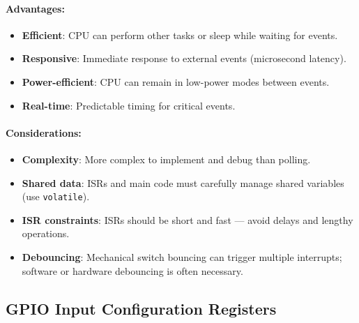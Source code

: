 \paragraph{Advantages:}
\begin{itemize}[nosep]
  \item \textbf{Efficient}: CPU can perform other tasks or sleep while waiting for events.
  \item \textbf{Responsive}: Immediate response to external events (microsecond latency).
  \item \textbf{Power-efficient}: CPU can remain in low-power modes between events.
  \item \textbf{Real-time}: Predictable timing for critical events.
\end{itemize}

\paragraph{Considerations:}
\begin{itemize}[nosep]
  \item \textbf{Complexity}: More complex to implement and debug than polling.
  \item \textbf{Shared data}: ISRs and main code must carefully manage shared variables (use \texttt{volatile}).
  \item \textbf{ISR constraints}: ISRs should be short and fast — avoid delays and lengthy operations.
  \item \textbf{Debouncing}: Mechanical switch bouncing can trigger multiple interrupts; software or hardware debouncing is often necessary.
\end{itemize}

\subsection{GPIO Input Configuration Registers}


